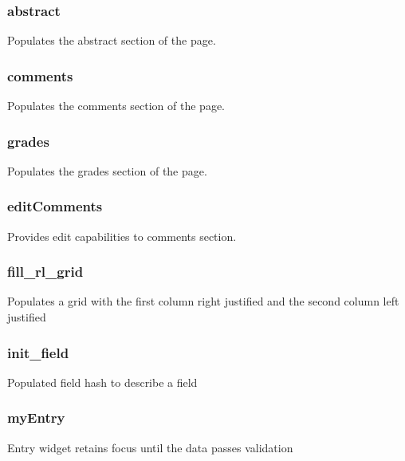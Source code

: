 \documentclass{article}
\begin{document}
\subsubsection*{abstract\label{EditPage_abstract}}


Populates the abstract section of the page.

\subsubsection*{comments\label{EditPage_comments}}


Populates the comments section of the page.

\subsubsection*{grades\label{EditPage_grades}}


Populates the grades section of the page.

\subsubsection*{editComments\label{EditPage_editComments}}


Provides edit capabilities to comments section.

\subsubsection*{fill\_rl\_grid\label{EditPage_fill_rl_grid}}


Populates a grid with the first column right justified and the second column
left justified

\subsubsection*{init\_field\label{EditPage_init_field}}


Populated field hash to describe a field

\subsubsection*{myEntry\label{EditPage_myEntry}}


Entry widget retains focus until the data passes validation
\end{document}
